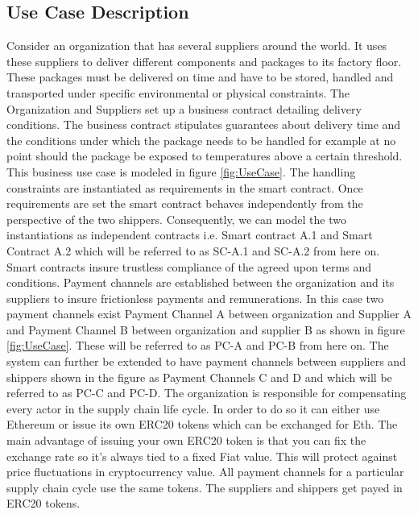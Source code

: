 \subsection{Use Case Description} \label{ST-Dapp-UC} 
Consider an organization that has several suppliers around the world. It uses these suppliers to deliver different components and packages to its factory floor. These packages must be delivered on time and have to be stored, handled and transported under specific environmental or physical constraints. The Organization and Suppliers set up a business contract detailing delivery conditions. The business contract stipulates guarantees about delivery time and the conditions under which the package needs to be handled for example at no point should the package be exposed to temperatures above a certain threshold.  This business use case is modeled in figure \ref{fig:UseCase}. The handling constraints are instantiated as requirements in the smart contract. Once requirements are set the smart contract behaves independently from the perspective of the two shippers. Consequently, we can model the two instantiations as independent contracts i.e. Smart contract A.1 and Smart Contract A.2 which will be referred to as SC-A.1 and SC-A.2 from here on. Smart contracts insure trustless compliance of the agreed upon terms and conditions. Payment channels are established between the organization and its suppliers to insure frictionless payments and remunerations. In this case two payment channels exist Payment Channel A between organization and Supplier A and Payment Channel B between organization and supplier B as shown in figure \ref{fig:UseCase}. These will be referred to as PC-A and PC-B from here on. The system can further be extended to have payment channels between suppliers and shippers shown in the figure as Payment Channels C and D and which will be referred to as PC-C and PC-D. The organization is responsible for compensating every actor in the supply chain life cycle. In order to do so it can either use Ethereum or issue its own ERC20 tokens which can be exchanged for Eth. The main advantage of issuing your own ERC20 token is that you can fix the exchange rate so it’s always tied to a fixed Fiat value. This will protect against price fluctuations in cryptocurrency value. All payment channels for a particular supply chain cycle use the same tokens. The suppliers and shippers get payed in ERC20 tokens.

